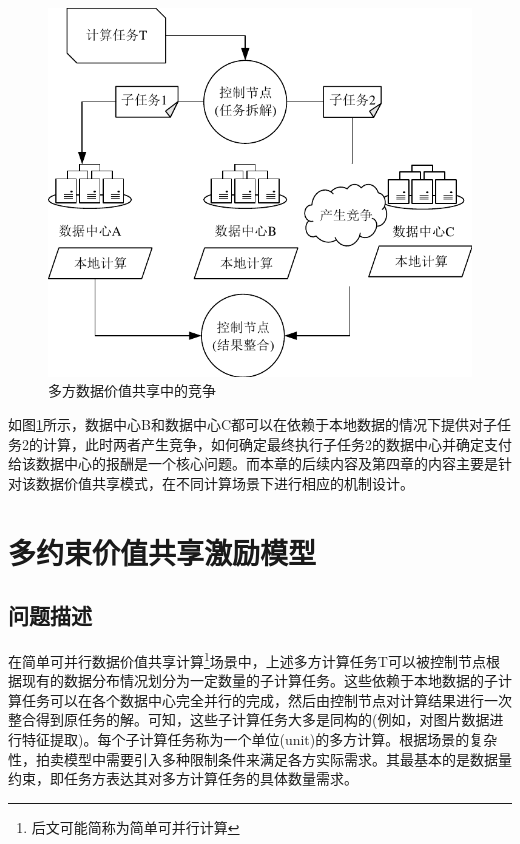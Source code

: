 \documentclass[promaster]{thesis-uestc}
\begin{document}
\begin{figure}[h]   
\includegraphics{pic/yuanweijili.pdf}
\caption{多方数据价值共享中的竞争}
\label{yuanweijili}
\end{figure}

如图\ref{yuanweijili}所示，数据中心B和数据中心C都可以在依赖于本地数据的情况下提供对子任务2的计算，此时两者产生竞争，如何确定最终执行子任务2的数据中心并确定支付给该数据中心的报酬是一个核心问题。而本章的后续内容及第四章的内容主要是针对该数据价值共享模式，在不同计算场景下进行相应的机制设计。

\section{多约束价值共享激励模型}

\subsection{问题描述}

在简单可并行数据价值共享计算\footnote{后文可能简称为简单可并行计算}场景中，上述多方计算任务T可以被控制节点根据现有的数据分布情况划分为一定数量的子计算任务。这些依赖于本地数据的子计算任务可以在各个数据中心完全并行的完成，然后由控制节点对计算结果进行一次整合得到原任务的解。可知，这些子计算任务大多是同构的(例如，对图片数据进行特征提取)。每个子计算任务称为一个单位(unit)的多方计算。根据场景的复杂性，拍卖模型中需要引入多种限制条件来满足各方实际需求。其最基本的是数据量约束，即任务方表达其对多方计算任务的具体数量需求。
\end{document}
